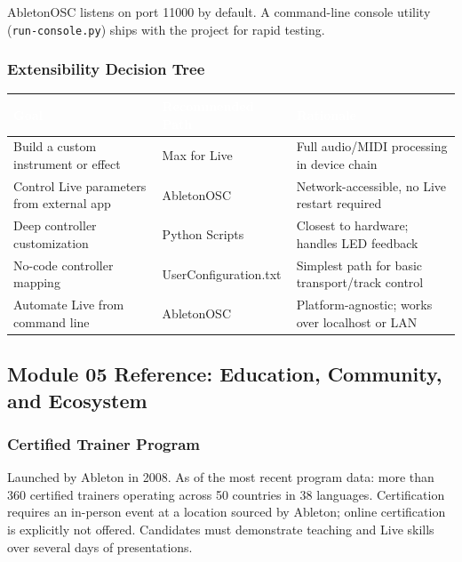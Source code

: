\documentclass[11pt,letterpaper]{article}
\newcommand{\tableheader}[1]{\textbf{\sffamily\textcolor{white}{#1}}}
\begin{document}
AbletonOSC listens on port 11000 by default. A command-line console utility (\texttt{run-console.py})
ships with the project for rapid testing.

\subsubsection{Extensibility Decision Tree}

\begin{center}
\begin{tabularx}{\textwidth}{L{4.5cm}L{2.5cm}X}
\toprule
{}
\tableheader{Goal} & \tableheader{Recommended Path} & \tableheader{Rationale} \\
\midrule
Build a custom instrument or effect & Max for Live & Full audio/MIDI processing in device chain \\
Control Live parameters from external app & AbletonOSC & Network-accessible, no Live restart required \\
Deep controller customization & Python Scripts & Closest to hardware; handles LED feedback \\
No-code controller mapping & UserConfiguration.txt & Simplest path for basic transport/track control \\
Automate Live from command line & AbletonOSC & Platform-agnostic; works over localhost or LAN \\
\bottomrule
\end{tabularx}
\end{center}

\subsection{Module 05 Reference: Education, Community, and Ecosystem}

\subsubsection{Certified Trainer Program}

Launched by Ableton in 2008. As of the most recent program data: more than 360 certified
trainers operating across 50 countries in 38 languages. Certification requires an in-person
event at a location sourced by Ableton; online certification is explicitly not offered.
Candidates must demonstrate teaching and Live skills over several days of presentations.
\end{document}
